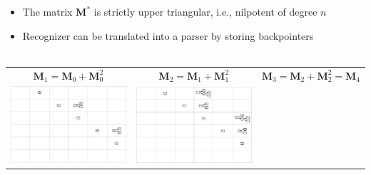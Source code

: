 \documentclass[portrait,a0b,final,a4resizeable]{a0poster}
\begin{document}
\begin{poster}
\begin{multicols}{2}
      \null\hspace*{3cm}\begin{minipage}[c]{0.90\columnwidth}
      \begin{itemize}
        \item The matrix $\mathbf M^*$ is strictly upper triangular, i.e., nilpotent of degree $n$
        \item Recognizer can be translated into a parser by storing backpointers\\\\
      \end{itemize}\vspace{-3cm}
      \begin{tabular}{ c c c }
        \small{$\mathbf{M}_1 = \mathbf{M}_0 + \mathbf{M}_0^2$} & \small{$\mathbf{M}_2 = \mathbf{M}_1 + \mathbf{M}_1^2$} & \small{$\mathbf{M}_3 = \mathbf{M}_2 + \mathbf{M}_2^2 = \mathbf{M}_4$} \\
        \includegraphics[trim=420 288 0 0,clip, width=12.24cm]{../figures/parse2.png} &
        \includegraphics[trim=420 285 0 0,clip, width=12.24cm]{../figures/parse3.png} &

\end{tabular}
\end{minipage}
\end{multicols}
\end{poster}
\end{document}
